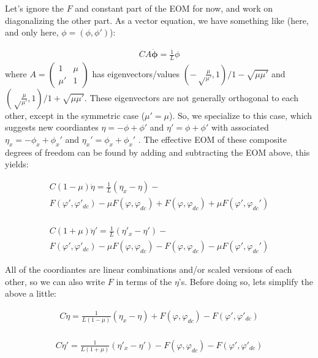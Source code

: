 \documentclass[paper=a4, twocolumn, fontsize=10pt]{article} %
\numberwithin{equation}{section} %
\numberwithin{figure}{section} %
\numberwithin{table}{section} %
\begin{document}
Let's ignore the $F$ and constant part of the EOM for now, and work on diagonalizing the other part. As a vector equation, we have something like (here, and only here, $\phi = (\phi, \phi')$):

\begin{align}{
    C A \ddot{\mathbf{\phi}} = \frac{1}{L} \phi 
}
\end{align}
where $A = \begin{pmatrix} 1 & \mu \\ \mu' & 1 \end{pmatrix}  $ has eigenvectors/values $(-\sqrt\frac{\mu}{\mu'}, 1)/1-\sqrt{\mu\mu'}$ and $(\sqrt\frac{\mu}{\mu'}, 1)/1+\sqrt{\mu\mu'}$. These eigenvectors are not generally orthogonal to each other, except in the symmetric case ($\mu'=\mu$). So, we specialize to this case, which suggests new coordiantes $\eta = -\phi +\phi'$ and $\eta' = \phi+\phi'$ with associated $\eta_x = -\phi_x + \phi_x'$ and $\eta_x' = \phi_x + \phi_x'$ . The effective EOM of these composite degrees of freedom can be found by adding and subtracting the EOM above, this yields:

\begin{multline}
    C(1-\mu) \ddot{\eta} = \frac{1}{L} (\eta_x-\eta) - \\ F(\varphi', \varphi'_{dc}) - \mu F(\varphi,\varphi_{dc}) + F(\varphi, \varphi_{dc}) + \mu F(\varphi',\varphi_{dc}')
\end{multline}
    \\
\begin{multline}
    C(1+\mu) \ddot{\eta}' = \frac{1}{L} (\eta'_x-\eta') - \\ F(\varphi', \varphi'_{dc}) - \mu F(\varphi,\varphi_{dc}) - F(\varphi, \varphi_{dc}) - \mu F(\varphi',\varphi_{dc}')
\end{multline}

All of the coordiantes are linear combinations and/or scaled versions of each other, so we can also write $F$ in terms of the $\eta$'s. Before doing so, lets simplify the above a little: 

\begin{multline}
    C \ddot{\eta} = \frac{1}{L(1-\mu)} (\eta_x-\eta) + F(\varphi, \varphi_{dc}) - F(\varphi', \varphi'_{dc})
\end{multline}
    \\
\begin{multline}
    C \ddot{\eta}' = \frac{1}{L(1+\mu)} (\eta'_x-\eta') - F(\varphi, \varphi_{dc}) - F(\varphi', \varphi'_{dc})
\end{multline}
\end{document}
